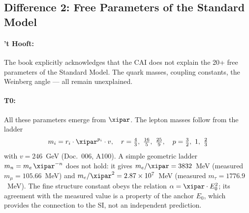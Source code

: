 \begin{table}[h]
    \centering
    \caption{Postulate vs.\ derivation: fundamental structures}
    \label{tab:postulate_vs_derivation}
\end{table}

\subsection{Difference 2: Free Parameters of the Standard Model}

\paragraph{'t Hooft:} The book explicitly acknowledges that the CAI does not
explain the 20+ free parameters of the Standard Model. The quark masses, coupling
constants, the Weinberg angle — all remain unexplained.

\paragraph{T0:} All these parameters emerge from $\xipar$. The lepton masses follow
from the ladder
\begin{equation}
    m_i = r_i \cdot \xipar^{p_i} \cdot v, \quad r = \tfrac{4}{3},\ \tfrac{16}{5},\ \tfrac{25}{9}, \quad p = \tfrac{3}{2},\ 1,\ \tfrac{2}{3}
    \label{eq:mass_spectrum}
\end{equation}
with $v = 246$~GeV (Doc.~006, A100). A simple geometric ladder
$m_n = m_e\,\xipar^{-n}$ does not hold: it gives $m_e/\xipar = 3832$~MeV (measured
$m_\mu = 105.66$~MeV) and $m_e/\xipar^2 = 2.87\times10^{7}$~MeV (measured
$m_\tau = 1776.9$~MeV). The fine structure constant obeys the relation
$\alpha = \xipar \cdot E_0^2$; its agreement with the measured value is a property
of the anchor $E_0$, which provides the connection to the SI, not an independent
prediction.

